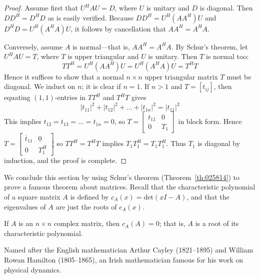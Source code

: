 \documentclass{ximera}
\begin{document}
\begin{proof}
Assume first that $U^{H}AU = D$, where $U$ is unitary and $D$ is diagonal. Then $DD^{H} = D^{H}D$ as is easily verified. Because $DD^{H} = U^{H}(AA^{H})U$ and $D^{H}D = U^{H}(A^{H}A)U$, it follows by cancellation that $AA^{H} = A^{H}A$.

Conversely, assume $A$ is normal---that is, $AA^{H} = A^{H}A$. By Schur's theorem, let $U^{H}AU = T$, where $T$ is upper triangular and $U$ is unitary. Then $T$ is normal too:
\begin{equation*}
TT^H = U^H(AA^H)U = U^H(A^HA)U = T^HT
\end{equation*}
Hence it suffices to show that a normal $n \times n$ upper triangular matrix $T$ must be diagonal. We induct on $n$; it is clear if $n = 1$. If $n > 1$ and $T = \left[ t_{ij} \right]$, then equating $(1, 1)$-entries in $TT^{H}$ and $T^{H}T$ gives
\begin{equation*}
|t_{11}|^2 + |t_{12}|^2 + \ldots + |t_{1n}|^2 = |t_{11}|^2
\end{equation*}
This implies $t_{12} = t_{13} = \ldots = t_{1n} = 0$, so $T = \left[ \begin{array}{cc}
t_{11} & 0 \\
0 & T_{1}
\end{array}\right]$ in block form. Hence $T = \left[ \begin{array}{cc}
\overline{t}_{11} & 0 \\
0 & T_{1}^H
\end{array}\right]$ so $TT^{H} = T^{H}T$ implies $T_{1}T_{1}^H = T_{1}T_{1}^H$. Thus $T_{1}$ is diagonal by induction, and the proof is complete.
\end{proof}

We conclude this section by using Schur's theorem (Theorem~\ref{th:025814}) to prove a famous theorem about matrices. Recall that the characteristic polynomial of a square matrix $A$ is defined by $c_{A}(x) = \mbox{det}(xI - A)$, and that the eigenvalues of $A$ are just the roots of $c_{A}(x)$.

\begin{theorem}\label{th:Cayley_Hamilton}
If $A$ is an $n \times n$ complex matrix, then $c_{A}(A) = 0$; that is, $A$ is a root of its characteristic polynomial.
\end{theorem}
\begin{remark}
Named after the English mathematician Arthur Cayley (1821--1895) and William Rowan Hamilton (1805--1865), an Irish mathematician famous for his work on physical dynamics.
\end{remark}
\end{document}
